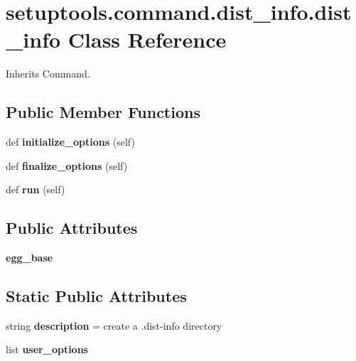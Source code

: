 \hypertarget{classsetuptools_1_1command_1_1dist__info_1_1dist__info}{}\section{setuptools.\+command.\+dist\+\_\+info.\+dist\+\_\+info Class Reference}
\label{classsetuptools_1_1command_1_1dist__info_1_1dist__info}


Inherits Command.

\subsection*{Public Member Functions}
\begin{DoxyCompactItemize}
\item 
\mbox{\label{classsetuptools_1_1command_1_1dist__info_1_1dist__info_a5446b8943ce08261eab3935e7307b330}} 
def {\bfseries initialize\+\_\+options} (self)
\item 
\mbox{\label{classsetuptools_1_1command_1_1dist__info_1_1dist__info_a7536d2a9045260747117f613a6305faa}} 
def {\bfseries finalize\+\_\+options} (self)
\item 
\mbox{\label{classsetuptools_1_1command_1_1dist__info_1_1dist__info_a1b1026394e982e20a3c34c36d2a30e51}} 
def {\bfseries run} (self)
\end{DoxyCompactItemize}
\subsection*{Public Attributes}
\begin{DoxyCompactItemize}
\item 
\mbox{\label{classsetuptools_1_1command_1_1dist__info_1_1dist__info_a796157c75a15a432209243acd7c74774}} 
{\bfseries egg\+\_\+base}
\end{DoxyCompactItemize}
\subsection*{Static Public Attributes}
\begin{DoxyCompactItemize}
\item 
\mbox{\label{classsetuptools_1_1command_1_1dist__info_1_1dist__info_a993b22e8f64ba10653c2722a78fcb843}} 
string {\bfseries description} = \textquotesingle{}create a .dist-\/info directory\textquotesingle{}
\item 
list {\bfseries user\+\_\+options}
\end{DoxyCompactItemize}


